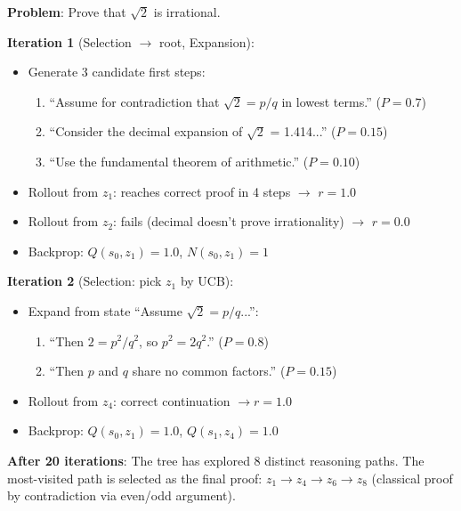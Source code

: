 \begin{examplebox}
\textbf{Problem}: Prove that $\sqrt{2}$ is irrational.

\textbf{Iteration 1} (Selection $\to$ root, Expansion):

\begin{itemize}
  \item Generate 3 candidate first steps:

\begin{enumerate}
  \item ``Assume for contradiction that $\sqrt{2} = p/q$ in lowest terms.'' ($P = 0.7$)
  \item ``Consider the decimal expansion of $\sqrt{2}$ = 1.414...'' ($P = 0.15$)
  \item ``Use the fundamental theorem of arithmetic.'' ($P = 0.10$)
\end{enumerate}
  \item Rollout from $z_1$: reaches correct proof in 4 steps $\to$ $r = 1.0$
  \item Rollout from $z_2$: fails (decimal doesn’t prove irrationality) $\to$ $r = 0.0$
  \item Backprop: $Q(s_0, z_1) = 1.0$, $N(s_0, z_1) = 1$
\end{itemize}

\textbf{Iteration 2} (Selection: pick $z_1$ by UCB):

\begin{itemize}
  \item Expand from state ``Assume $\sqrt{2} = p/q$...'':

\begin{enumerate}
  \item ``Then $2 = p^2/q^2$, so $p^2 = 2q^2$.'' ($P = 0.8$)
  \item ``Then $p$ and $q$ share no common factors.'' ($P = 0.15$)
\end{enumerate}
  \item Rollout from $z_4$: correct continuation $\to r = 1.0$
  \item Backprop: $Q(s_0, z_1) = 1.0$, $Q(s_1, z_4) = 1.0$
\end{itemize}

\textbf{After 20 iterations}: The tree has explored 8 distinct reasoning paths. The most-visited path is selected as the final proof: $z_1 \to z_4 \to z_6 \to z_8$ (classical proof by contradiction via even/odd argument).
\end{examplebox}

